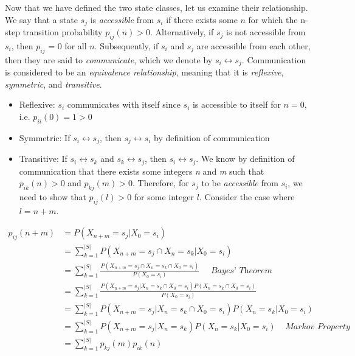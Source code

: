 \documentclass[a4paper, 12pt]{article}
\begin{document}
	Now that we have defined the two state classes, let us examine their relationship. We say that a state $s_j$ is 
	\textit{accessible} from $s_i$ if there exists some $n$ for which the n-step transition probability $p_{ij}(n) > 0$.
	Alternatively, if $s_j$ is not accessible from $s_i$, then $p_{ij}$ = 0 for all $n$. Subsequently, if $s_i$ and $s_j$ 
	are accessible from each other, then they are said to \textit{communicate}, which we denote by $s_i \leftrightarrow s_j$.
	Communication is considered to be an \textit{equivalence relationship}, meaning that it is \textit{reflexive}, 
	\textit{symmetric}, and \textit{transitive}.

	\begin{itemize}
	\item Reflexive: $s_i$ communicates with itself since $s_i$ is accessible to itself for $n = 0$, i.e. $p_{ii}(0) = 1 > 0$
	\item Symmetric: If $s_i \leftrightarrow s_j$, then $s_j \leftrightarrow s_i$ by definition of communication
	\item Transitive: If $s_i \leftrightarrow s_k$ and $s_k \leftrightarrow s_j$, then $s_i \leftrightarrow s_j$. We know by 
	definition of communication that there exists some integers \textit{n} and \textit{m} such that 
	$p_{ik}(n) > 0$ and $p_{kj}(m) > 0$. Therefore, for $s_j$ to be \textit{accessible} from $s_i$, we need to show that 
	$p_{ij}(l) > 0$ for some integer $l$. Consider the case where $l = n+m$.
	\end{itemize}
	
	\begin{equation*}
		\begin{aligned}
			p_{ij}(n+m) &= P(X_{n+m} = s_j | X_0 = s_i) \\
						&= \sum_{k=1}^{|S|} P(X_{n+m} = s_j \cap X_n = s_k | X_0 = s_i) \\
						&= \sum_{k=1}^{|S|} \frac{P(X_{n+m} = s_j \cap X_n = s_k \cap X_0 = s_i)}{P(X_0 = s_i)}\ \;\;\;\; \textit{Bayes' Theorem} \\
						&= \sum_{k=1}^{|S|} \frac{P(X_{n+m} = s_j | X_n = s_k \cap X_0 = s_i)P(X_n = s_k \cap X_0 = s_i)}{P(X_0 = s_i)}\ \\
						&= \sum_{k=1}^{|S|} P(X_{n+m} = s_j | X_n = s_k \cap X_0 = s_i)P(X_n = s_k | X_0 = s_i) \\
						&= \sum_{k=1}^{|S|} P(X_{n+m} = s_j | X_n = s_k)P(X_n = s_k | X_0 = s_i) \;\;\;\; \textit{Markov Property} \\ 
						&= \sum_{k=1}^{|S|} p_{kj}(m)p_{ik}(n) \\
		\end{aligned}
	\end{equation*}	
	
\end{document}
